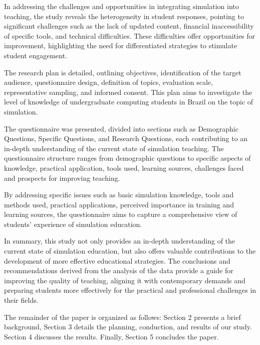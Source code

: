 In addressing the challenges and opportunities in integrating simulation into teaching, the study reveals the heterogeneity in student responses, pointing to significant challenges such as the lack of updated content, financial inaccessibility of specific tools, and technical difficulties. These difficulties offer opportunities for improvement, highlighting the need for differentiated strategies to stimulate student engagement.

The research plan is detailed, outlining objectives, identification of the target audience, questionnaire design, definition of topics, evaluation scale, representative sampling, and informed consent. This plan aims to investigate the level of knowledge of undergraduate computing students in Brazil on the topic of simulation.

The questionnaire was presented, divided into sections such as Demographic Questions, Specific Questions, and Research Questions, each contributing to an in-depth understanding of the current state of simulation teaching. The questionnaire structure ranges from demographic questions to specific aspects of knowledge, practical application, tools used, learning sources, challenges faced and prospects for improving teaching.

By addressing specific issues such as basic simulation knowledge, tools and methods used, practical applications, perceived importance in training and learning sources, the questionnaire aims to capture a comprehensive view of students’ experience of simulation education.

In summary, this study not only provides an in-depth understanding of the current state of simulation education, but also offers valuable contributions to the development of more effective educational strategies. The conclusions and recommendations derived from the analysis of the data provide a guide for improving the quality of teaching, aligning it with contemporary demands and preparing students more effectively for the practical and professional challenges in their fields.

The remainder of the paper is organized as follows: Section 2 presents a brief background, Section 3 details the planning, conduction, and results of our study. Section 4 discusses the results. Finally, Section 5 concludes the paper.



